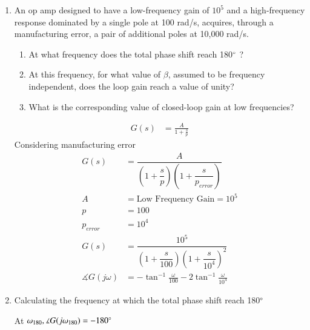\begin{enumerate}[label=\thesection.\arabic*.,ref=\thesection.\theenumi]
\item An op amp designed to have a low-frequency gain of $10^{5}$ and a high-frequency response dominated by a single pole at 100 rad/s, acquires, through a manufacturing error, a pair of additional poles at 10,000 rad/s. 
\begin{enumerate}
\item At what frequency does the total phase shift reach 180$\degree$ ? 
\item At this frequency, for what value of $\beta$, assumed to be frequency independent, does the loop gain reach a value of unity? 
\item What is the corresponding value of closed-loop gain at low frequencies?
\end{enumerate}
\solution
\begin{align}
G(s) &= \frac{A}{1+\frac{s}{p}} 
\end{align}
Considering manufacturing error
\begin{align}
G(s) &= \dfrac{A}{(1+\dfrac{s}{p})(1+\dfrac{s}{p_{error}})} 
\\
A &= \text{Low Frequency Gain} = 10^{5}
\\
p &= 100
\\
p_{error} &= 10^{4}
\\
G(s) &= \dfrac{10^{5}}{(1+\dfrac{s}{100})(1+\dfrac{s}{10^{4}})^{2}}
\\
\measuredangle G(j\omega) &= -\tan^{-1}\frac{\omega}{100} - 2\tan^{-1}\frac{\omega}{10^{4}}
\end{align}
\item Calculating the frequency at which the total phase shift reach 180$\degree$ 

At $\omega_{180}, \measuredangle G(j\omega_{180}) = -180\degree$


\end{enumerate}
